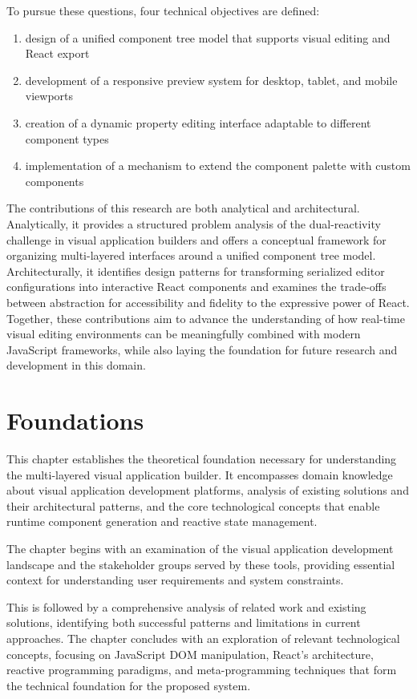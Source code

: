\documentclass[oneside,12pt]{book}
\begin{document}
To pursue these questions, four technical objectives are defined:
\begin{enumerate}
  \item design of a unified component tree model that supports visual editing and React export
  \item development of a responsive preview system for desktop, tablet, and mobile viewports
  \item creation of a dynamic property editing interface adaptable to different component types
  \item implementation of a mechanism to extend the component palette with custom components
\end{enumerate}

The contributions of this research are both analytical and architectural. Analytically, it provides a structured problem analysis of the dual-reactivity challenge in visual application builders and offers a conceptual framework for organizing multi-layered interfaces around a unified component tree model. Architecturally, it identifies design patterns for transforming serialized editor configurations into interactive React components and examines the trade-offs between abstraction for accessibility and fidelity to the expressive power of React. Together, these contributions aim to advance the understanding of how real-time visual editing environments can be meaningfully combined with modern JavaScript frameworks, while also laying the foundation for future research and development in this domain.

\newpage

\chapter{Foundations}
\label{ch:foundations}

This chapter establishes the theoretical foundation necessary for understanding the multi-layered visual application builder. It encompasses domain knowledge about visual application development platforms, analysis of existing solutions and their architectural patterns, and the core technological concepts that enable runtime component generation and reactive state management.

The chapter begins with an examination of the visual application development landscape and the stakeholder groups served by these tools, providing essential context for understanding user requirements and system constraints. 

This is followed by a comprehensive analysis of related work and existing solutions, identifying both successful patterns and limitations in current approaches. The chapter concludes with an exploration of relevant technological concepts, focusing on JavaScript \gls{DOM} manipulation, React's architecture, reactive programming paradigms, and meta-programming techniques that form the technical foundation for the proposed system.
\end{document}
